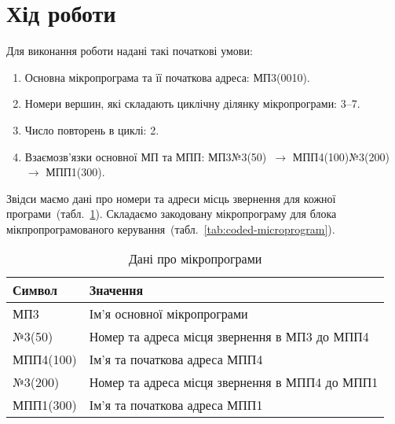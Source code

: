\documentclass[a4paper,oneside,DIV=12,12pt,headings=normal]{scrartcl}
\begin{document}
		\section{Хід роботи}
			Для виконання роботи надані такі початкові умови:
			\begin{enumerate}
				\item Основна мікропрограма та її початкова адреса: МП3(0010).
				\item Номери вершин, які складають циклічну ділянку мікропрограми: 3–7.
				\item Число повторень в циклі: 2.
				\item Взаємозв'язки основної МП та МПП: МП3№3(50)~$\rightarrow$ МПП4(100)№3(200)~$\rightarrow$ МПП1(300).
			\end{enumerate}
			Звідси маємо дані про номери та адреси місць звернення для кожної програми~(табл.~\ref{tab:mp-details}). Складаємо закодовану мікропрограму для блока мікпропрограмованого керування~(табл.~\ref{tab:coded-microprogram}).
			\begin{table}[!htbp]
				\begin{tabular}{ll}
					\toprule
						Символ & Значення \\
					\midrule
						МП3       & Ім'я основної мікропрограми\\
						№3(50)    & Номер та адреса місця звернення в МП3 до МПП4\\
						МПП4(100) & Ім'я та початкова адреса МПП4\\
						№3(200)   & Номер та адреса місця звернення в МПП4 до МПП1\\
						МПП1(300) & Ім'я та початкова адреса МПП1\\
					\bottomrule
				\end{tabular}
				\caption{Дані про мікропрограми}
				\label{tab:mp-details}
			\end{table}
\end{document}
